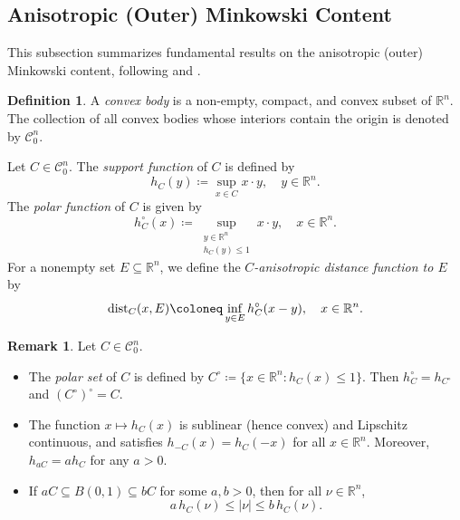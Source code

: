 \documentclass[pdflatex,sn-mathphys-num]{sn-jnl}
\theoremstyle{plain}
\theoremstyle{definition}
\newtheorem{definition}[theorem]{Definition}
\newtheorem{rem}[theorem]{Remark}
\begin{document}
         \subsection{Anisotropic (Outer) Minkowski Content}
This subsection summarizes fundamental results on the anisotropic (outer) Minkowski content, following \cite{chambolle} and \cite{Villa2}.

\begin{definition}\label{convexity}
A \textit{convex body} is a non-empty, compact, and convex subset of $\mathbb{R}^n$.  
The collection of all convex bodies whose interiors contain the origin is denoted by $\mathcal{C}^n_0$.

Let $C \in \mathcal{C}^n_0$.  
The \textit{support function} of $C$ is defined by
\[
h_C(y) \coloneq \sup_{x \in C} x \cdot y, \quad y \in \mathbb{R}^n.
\]
The \textit{polar function} of $C$ is given by
\[
h_C^{\circ}(x) \coloneq \sup_{\substack{y \in \mathbb{R}^n \\ h_C(y) \leq 1}} x \cdot y, \quad x \in \mathbb{R}^n.
\]
For a nonempty set $E \subseteq \mathbb{R}^n$, we define the \textit{$C$-anisotropic distance function to $E$} by
\[
\textup{dist}_C(x, E) \coloneq \inf_{y \in E} h_C^{\circ}(x - y), \quad x \in \mathbb{R}^n.
\]
\end{definition}

\begin{rem}
Let $C \in \mathcal{C}^n_0$.  
\begin{itemize}
    \item The \textit{polar set} of $C$ is defined by $C^{\circ} \coloneq \{ x \in \mathbb{R}^n : h_C(x) \leq 1 \}$.  
    Then $h_C^{\circ} = h_{C^{\circ}}$ and $(C^{\circ})^{\circ} = C$.
    \item The function $x \mapsto h_C(x)$ is sublinear (hence convex) and Lipschitz continuous, and satisfies $h_{-C}(x) = h_C(-x)$ for all $x \in \mathbb{R}^n$.  
    Moreover, $h_{aC} = a h_C$ for any $a > 0$.
    \item If $a C \subseteq B(0,1) \subseteq b C$ for some $a,b > 0$, then for all $\nu \in \mathbb{R}^n$,
    \begin{equation}\label{hurich}
        a\,h_C(\nu) \leq |\nu| \leq b\,h_C(\nu).
    \end{equation}
\end{itemize}
\end{rem}
\end{document}
